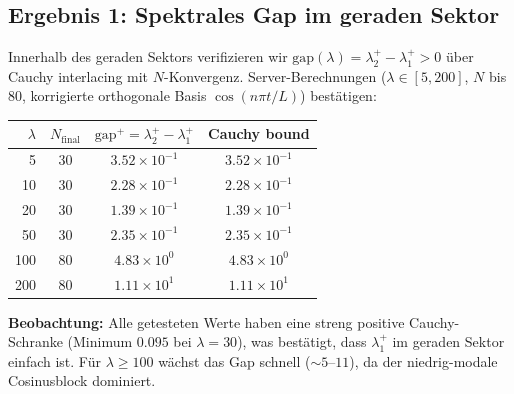 \documentclass[12pt,a4paper]{article}
\theoremstyle{definition}
\theoremstyle{remark}
\begin{document}
\subsection{Ergebnis 1: Spektrales Gap im geraden Sektor}

Innerhalb des geraden Sektors verifizieren wir $\mathrm{gap}(\lambda) = \lambda_2^+ - \lambda_1^+ > 0$ über Cauchy interlacing mit $N$-Konvergenz. Server-Berechnungen ($\lambda \in [5,200]$, $N$ bis 80, korrigierte orthogonale Basis $\cos(n\pi t/L)$) bestätigen:

\medskip
\begin{center}
\renewcommand{\arraystretch}{1.2}
\begin{tabular}{r|c|c|c}
$\lambda$ & $N_{\mathrm{final}}$ & $\mathrm{gap}^+ = \lambda_2^+ - \lambda_1^+$ & Cauchy bound \\\hline
5 & 30 & $3.52\times 10^{-1}$ & $3.52\times 10^{-1}$ \\
10 & 30 & $2.28\times 10^{-1}$ & $2.28\times 10^{-1}$ \\
20 & 30 & $1.39\times 10^{-1}$ & $1.39\times 10^{-1}$ \\
50 & 30 & $2.35\times 10^{-1}$ & $2.35\times 10^{-1}$ \\
100 & 80 & $4.83\times 10^{0}$ & $4.83\times 10^{0}$ \\
200 & 80 & $1.11\times 10^{1}$ & $1.11\times 10^{1}$ \\
\end{tabular}
\end{center}

\medskip\noindent
\textbf{Beobachtung:} Alle getesteten Werte haben eine streng positive Cauchy-Schranke (Minimum $0.095$ bei $\lambda=30$), was bestätigt, dass $\lambda_1^+$ im geraden Sektor einfach ist. Für $\lambda \geq 100$ wächst das Gap schnell ($\sim 5$--$11$), da der niedrig-modale Cosinusblock dominiert.
\end{document}

